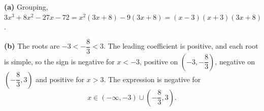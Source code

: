 \textbf{(a)} Grouping, $3x^3+8x^2-27x-72=x^2(3x+8)-9(3x+8)=\boxed{(x-3)(x+3)(3x+8)}$.

\textbf{(b)} The roots are $-3<-\dfrac83<3$. The leading coefficient is positive, and each root is simple, so the sign is negative for $x<-3$, positive on $\left(-3,-\dfrac83\right)$, negative on $\left(-\dfrac83,3\right)$ and positive for $x>3$. The expression is negative for
\[\boxed{x\in(-\infty,-3)\cup\left(-\dfrac83,3\right)}.\]
